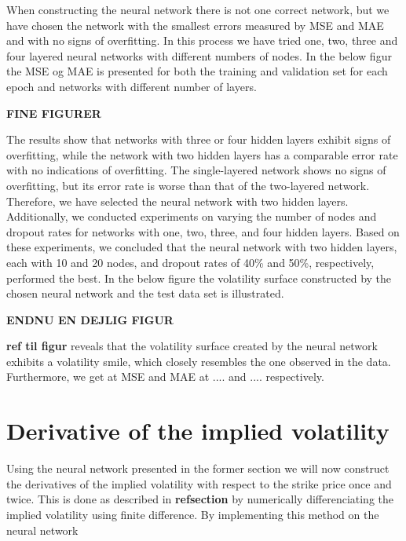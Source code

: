 When constructing the neural network there is not one correct network, but we have chosen the network with the smallest errors measured by MSE and MAE and with no signs of overfitting. In this process we have tried one, two, three and four layered neural networks with different numbers of nodes. In the below figur the MSE og MAE is presented for both the training and validation set for each epoch and networks with different number of layers. 

\textbf{FINE FIGURER}

The results show that networks with three or four hidden layers exhibit signs of overfitting, while the network with two hidden layers has a comparable error rate with no indications of overfitting. The single-layered network shows no signs of overfitting, but its error rate is worse than that of the two-layered network. Therefore, we have selected the neural network with two hidden layers. Additionally, we conducted experiments on varying the number of nodes and dropout rates for networks with one, two, three, and four hidden layers. Based on these experiments, we concluded that the neural network with two hidden layers, each with 10 and 20 nodes, and dropout rates of 40\% and 50\%, respectively, performed the best. In the below figure the volatility surface constructed by the chosen neural network and the test data set is illustrated.

\textbf{ENDNU EN DEJLIG FIGUR}

\textbf{ref til figur} reveals that the volatility surface created by the neural network exhibits a volatility smile, which closely resembles the one observed in the data. Furthermore, we get at MSE and MAE at .... and .... respectively. 

\section{Derivative of the implied volatility}
Using the neural network presented in the former section we will now construct the derivatives of the implied volatility with respect to the strike price once and twice. This is done as described in \textbf{refsection} by numerically differenciating the implied volatility using finite difference. By implementing this method on the neural network 

 





